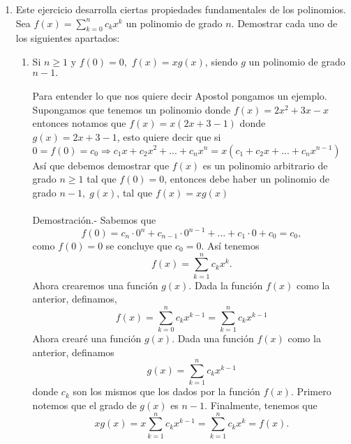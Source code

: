 \begin{enumerate}[ \bfseries 1.]
        \item Este ejercicio desarrolla ciertas propiedades fundamentales de los polinomios. Sea $f(x)=\displaystyle\sum_{k=0}^{n} c_k x^k$ un polinomio de grado $n$. Demostrar cada uno de los siguientes apartados:
            \begin{enumerate}[\bfseries (a)]
                \item Si $n \geq 1$ \; y \; $f(0)=0,$ $f(x)=xg(x)$, siendo $g$ un polinomio de grado $n-1.$\\\\
                Para entender lo que nos quiere decir Apostol pongamos un ejemplo. Supongamos que tenemos un polinomio donde $f(x)=2x^2+3x-x$ entonces notamos que $f(x)=x(2x+3-1)$ donde $g(x)=2x+3-1$, esto quiere decir que si $0 = f(0)=c_0 \Rightarrow c_1 x + c_2 x^2 + ... + c_n x^n = x(c_1 + c_2 x + ... + c_n x^{n-1})$ 
                Así que debemos demostrar que $f(x)$ es un polinomio arbitrario de grado $n \geq 1$ tal que $f(0)=0$, entonces debe haber un polinomio de grado $n-1, \; g(x)$, tal que $f(x)=xg(x)$\\\\
                Demostración.- \; Sabemos que $$f(0) = c_n \cdot 0^n + c_{n-1} \cdot 0^{n-1} + ... + c_1 \cdot 0 + c_0 =c_0,$$ como $f(0)=0$ se concluye que $c_0=0$. Así tenemos $$f(x)=\displaystyle\sum_{k=1}^{n} c_k x^k.$$ Ahora crearemos una función $g(x).$ Dada la función $f(x)$ como la anterior, definamos, $$f(x)=\displaystyle\sum_{k=0}^{n} c_k x^{k-1} = \sum_{k=1}^{n} c_k x^{k-1}$$ 
                Ahora crearé una función $g(x)$. Dada una función $f(x)$ como la anterior, definamos  $$g(x) = \displaystyle\sum_{k=1}^{n} c_k x^{k-1}$$
                donde $c_k$ son los mismos que los dados por la función $f(x)$. Primero notemos que el grado de $g(x)$ es $n-1$. Finalmente, tenemos que $$ xg(x) = x \displaystyle\sum_{k=1}^{n} c_k x^{k-1} = \sum_{k=1}^{n} c_k x^k = f(x).$$ \\\\


\end{enumerate}
\end{enumerate}
